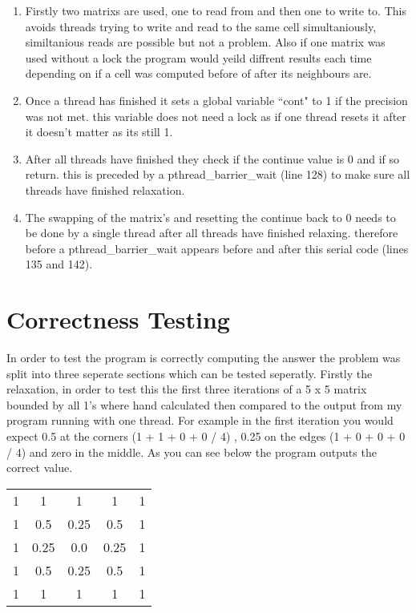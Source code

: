 \documentclass{article}
\begin{document}
\begin{enumerate}
\item Firstly two matrixs are used, one to read from and then one to write to.
This avoids threads trying to write and read to the same cell simultaniously,
similtanious reads are possible but not a problem. Also if one matrix was used without
a lock the program would yeild diffrent results each time depending on if a cell
was computed before of after its neighbours are.
\item Once a thread has finished it sets a global variable ``cont" to 1 if the
precision was not met. this variable does not need a lock as if one thread resets
it after it doesn't matter as its still 1.
\item After all threads have finished they check if the continue value is 0 and if
so return. this is preceded by a pthread\_barrier\_wait (line 128) to make sure all threads have
finished relaxation.
\item The swapping of the matrix's and resetting the continue back to 0 needs to be
done by a single thread after all threads have finished relaxing. therefore before a
pthread\_barrier\_wait appears before and after this serial code (lines 135 and 142).
\end{enumerate}

\section{Correctness Testing}
In order to test the program is correctly computing the answer the problem was split
into three seperate sections which can be tested seperatly. Firstly the relaxation,
in order to test this the first three iterations of a 5 x 5 matrix bounded by all 1's
where hand calculated then compared to the output from my program running with one
thread. For example in the first iteration you would expect 0.5 at the corners (1 + 1 + 0 + 0 / 4)
, 0.25 on the edges (1 + 0 + 0 + 0 / 4) and zero in the middle. As you can see below the program outputs the correct
value.

\begin{center}
\begin{tabular}{ c c c c c }
 1 & 1 & 1 & 1 & 1 \\
 1 & 0.5 & 0.25 & 0.5 & 1 \\
 1 & 0.25 & 0.0 & 0.25 & 1 \\
 1 & 0.5 & 0.25 & 0.5 & 1 \\
 1 & 1 & 1 & 1 & 1 \\
\end{tabular}
\end{center}
\end{document}
